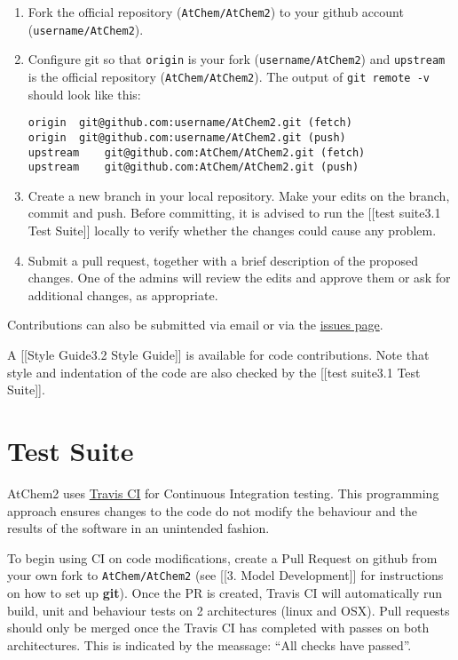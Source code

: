 \begin{enumerate}
\item Fork the official repository (\texttt{AtChem/AtChem2}) to your
  github account (\texttt{username/AtChem2}).
\item Configure git so that \texttt{origin} is your fork
  (\texttt{username/AtChem2}) and \texttt{upstream} is the official
  repository (\texttt{AtChem/AtChem2}). The output of \texttt{git\
    remote\ -v} should look like this:

\begin{verbatim}
origin  git@github.com:username/AtChem2.git (fetch)
origin  git@github.com:username/AtChem2.git (push)
upstream    git@github.com:AtChem/AtChem2.git (fetch)
upstream    git@github.com:AtChem/AtChem2.git (push)
\end{verbatim}

\item Create a new branch in your local repository. Make your edits on
  the branch, commit and push. Before committing, it is advised to run
  the {[}{[}test suite\textbar{}3.1 Test Suite{]}{]} locally to verify
  whether the changes could cause any problem.
\item Submit a pull request, together with a brief description of the
  proposed changes. One of the admins will review the edits and
  approve them or ask for additional changes, as appropriate.
\end{enumerate}

Contributions can also be submitted via email or via the
\href{https://github.com/AtChem/AtChem2/issues}{issues page}.

A {[}{[}Style Guide\textbar{}3.2 Style Guide{]}{]} is available for
code contributions. Note that style and indentation of the code are
also checked by the {[}{[}test suite\textbar{}3.1 Test Suite{]}{]}.

\section{Test Suite} \label{sec:testsuite}

AtChem2 uses \href{https://travis-ci.org/}{Travis CI} for Continuous
Integration testing. This programming approach ensures changes to the
code do not modify the behaviour and the results of the software in an
unintended fashion.

To begin using CI on code modifications, create a Pull Request on
github from your own fork to \texttt{AtChem/AtChem2} (see
{[}{[}3. Model Development{]}{]} for instructions on how to set up
\textbf{git}). Once the PR is created, Travis CI will automatically
run build, unit and behaviour tests on 2 architectures (linux and
OSX). Pull requests should only be merged once the Travis CI has
completed with passes on both architectures. This is indicated by the
meassage: ``All checks have passed''.

